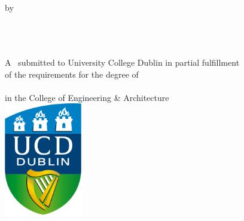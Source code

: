 \begin{titlepage}

\center %


\vspace*{\fill}

\makeatletter
\onehalfspacing
{\Large \bfseries \thesistitle}\\[0.5cm] %


by\\[0.5cm]

\ifdefined\authorid
\authorname\\ %
\authorid\\[2cm] %
\else
\textbf{\authorname}\\[1cm] %
\fi


 A \typeofthesis\ submitted to University College Dublin in partial fulfillment\\of the requirements for the degree of\\
\textbf{\degree}\\
in the College of Engineering \& Architecture
\\[1cm]


\includegraphics[height=5cm]{title/University_College_Dublin_logo.svg.png}\\[1cm] 


\end{titlepage}
